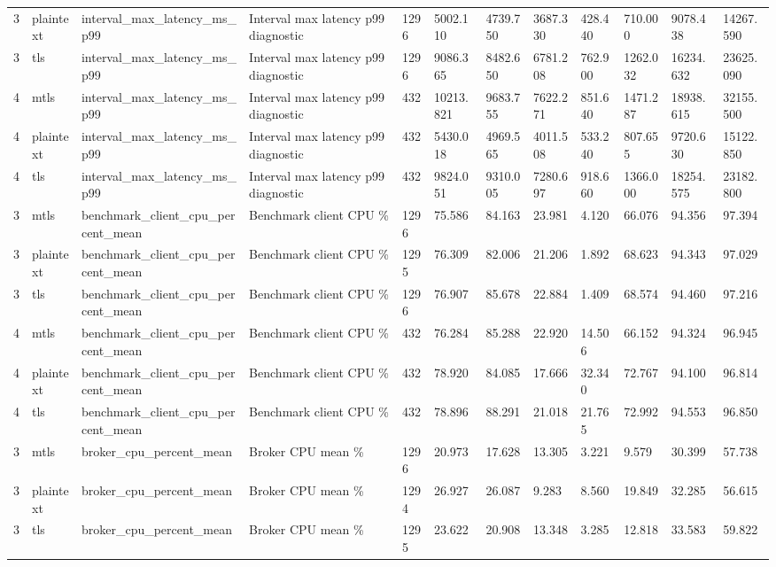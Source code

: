 \begin{longtable}{llllllllllll}
3 & plaintext & interval\_max\_latency\_ms\_p99 & Interval max latency p99 diagnostic & 1296 & 5002.110 & 4739.750 & 3687.330 & 428.440 & 710.000 & 9078.438 & 14267.590 \\
3 & tls & interval\_max\_latency\_ms\_p99 & Interval max latency p99 diagnostic & 1296 & 9086.365 & 8482.650 & 6781.208 & 762.900 & 1262.032 & 16234.632 & 23625.090 \\
4 & mtls & interval\_max\_latency\_ms\_p99 & Interval max latency p99 diagnostic & 432 & 10213.821 & 9683.755 & 7622.271 & 851.640 & 1471.287 & 18938.615 & 32155.500 \\
4 & plaintext & interval\_max\_latency\_ms\_p99 & Interval max latency p99 diagnostic & 432 & 5430.018 & 4969.565 & 4011.508 & 533.240 & 807.655 & 9720.630 & 15122.850 \\
4 & tls & interval\_max\_latency\_ms\_p99 & Interval max latency p99 diagnostic & 432 & 9824.051 & 9310.005 & 7280.697 & 918.660 & 1366.000 & 18254.575 & 23182.800 \\
3 & mtls & benchmark\_client\_cpu\_percent\_mean & Benchmark client CPU \% & 1296 & 75.586 & 84.163 & 23.981 & 4.120 & 66.076 & 94.356 & 97.394 \\
3 & plaintext & benchmark\_client\_cpu\_percent\_mean & Benchmark client CPU \% & 1295 & 76.309 & 82.006 & 21.206 & 1.892 & 68.623 & 94.343 & 97.029 \\
3 & tls & benchmark\_client\_cpu\_percent\_mean & Benchmark client CPU \% & 1296 & 76.907 & 85.678 & 22.884 & 1.409 & 68.574 & 94.460 & 97.216 \\
4 & mtls & benchmark\_client\_cpu\_percent\_mean & Benchmark client CPU \% & 432 & 76.284 & 85.288 & 22.920 & 14.506 & 66.152 & 94.324 & 96.945 \\
4 & plaintext & benchmark\_client\_cpu\_percent\_mean & Benchmark client CPU \% & 432 & 78.920 & 84.085 & 17.666 & 32.340 & 72.767 & 94.100 & 96.814 \\
4 & tls & benchmark\_client\_cpu\_percent\_mean & Benchmark client CPU \% & 432 & 78.896 & 88.291 & 21.018 & 21.765 & 72.992 & 94.553 & 96.850 \\
3 & mtls & broker\_cpu\_percent\_mean & Broker CPU mean \% & 1296 & 20.973 & 17.628 & 13.305 & 3.221 & 9.579 & 30.399 & 57.738 \\
3 & plaintext & broker\_cpu\_percent\_mean & Broker CPU mean \% & 1294 & 26.927 & 26.087 & 9.283 & 8.560 & 19.849 & 32.285 & 56.615 \\
3 & tls & broker\_cpu\_percent\_mean & Broker CPU mean \% & 1295 & 23.622 & 20.908 & 13.348 & 3.285 & 12.818 & 33.583 & 59.822 \\

\end{longtable}
